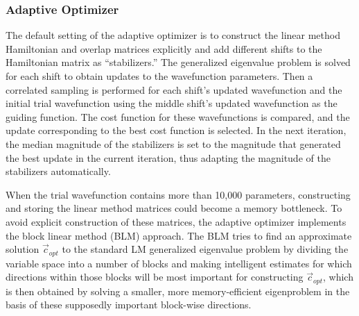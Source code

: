 \subsubsection{Adaptive Optimizer}

The default setting of the adaptive optimizer is to construct the linear method Hamiltonian and overlap matrices explicitly and add different shifts to the Hamiltonian matrix 
as ``stabilizers.''
The generalized eigenvalue problem is solved for each shift to obtain updates to the wavefunction parameters.
Then a correlated sampling is performed for each shift's updated wavefunction and the initial trial wavefunction
using the middle shift's updated wavefunction as the guiding function.
The cost function for these wavefunctions is compared, and the update corresponding to the best cost function is selected.
In the next iteration, the median magnitude of the stabilizers is set to the magnitude that generated the best update in the current iteration, thus adapting the magnitude of
the stabilizers automatically.

When the trial wavefunction contains more than 10,000 parameters, constructing and storing the linear method matrices could become a memory bottleneck. 
To avoid explicit construction of these matrices, the adaptive optimizer implements the block linear method (BLM) approach. \cite{Zhao:2017:blocked_lm}
The BLM tries to find an approximate 
solution\:  $\vec{c}_{opt}$ to the standard LM generalized eigenvalue problem by dividing the variable space into a number of blocks
and making intelligent estimates for which directions within those blocks will be most important for constructing\:   $\vec{c}_{opt}$, 
which is then obtained by solving a smaller, more memory-efficient 
eigenproblem in the basis of these supposedly important block-wise directions. 

